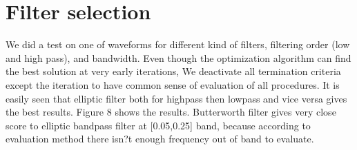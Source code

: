 
\section{Filter selection}

We did a test on one of waveforms for different kind of filters, filtering order (low and high pass), and bandwidth. Even though the optimization algorithm can find the best solution at very early iterations, We deactivate all termination criteria except the iteration to have  common sense of evaluation of all procedures. It is easily seen that elliptic filter both for highpass then lowpass and vice versa gives the best results. Figure 8 shows the results. Butterworth filter gives very close score to elliptic bandpass filter at [0.05,0.25] band, because according to evaluation method there isn?t enough frequency out of band to evaluate. 


